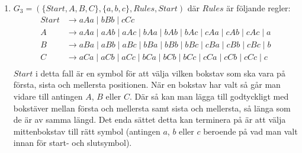 \documentclass{article}
\begin{document}
\begin{enumerate}[label=(\alph*)]
\item
$G_{3} = (\{Start, A, B, C\}, \{a, b, c\}, Rules, Start)$ där $Rules$ är följande regler: 
\begin{align*}
Start & \to aAa \;|\; bBb \;|\; cCc \\
A & \to aAa \;|\; aAb \;|\; aAc \;|\; bAa \;|\; bAb \;|\; bAc \;|\;  cAa \;|\; cAb \;|\; cAc \;|\; a \\
B & \to aBa \;|\; aBb \;|\; aBc \;|\; bBa \;|\; bBb \;|\; bBc \;|\;  cBa  \;|\; cBb  \;|\; cBc \;|\; b \\
C & \to aCa \;|\; aCb \;|\; aCc \;|\; bCa \;|\; bCb \;|\; bCc \;|\; cCa \;|\; cCb \;|\;  cCc \;|\; c \\
\end{align*} 
$Start$ i detta fall är en symbol för att välja vilken bokstav som ska vara på första, sista och mellersta positionen. När en bokstav har valt så går man vidare till antingen $A$, $B$ eller $C$. Där så kan man lägga till godtyckligt med bokstäver mellan första och mellersta samt sista och mellersta, så länga som de är av samma längd. Det enda sättet detta kan terminera på är att välja mittenbokstav till rätt symbol (antingen $a$, $b$ eller $c$ beroende på vad man valt innan för start- och slutsymbol).
\end{enumerate}

\section{}
\end{document}
